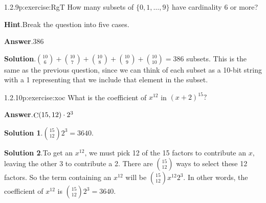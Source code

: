 \documentclass[twoside,11pt,]{book}
\newcommand{\blocktitlefont}{\relax}
\numberwithin{equation}{chapter}
\begin{document}
\begin{divisionsolution}{1.2.9}{}{p:exercise:RgT}%
How many subsets of \(\{0,1,\ldots, 9\}\) have cardinality 6 or more?%
\par\smallskip%
\noindent\textbf{\blocktitlefont Hint}.\quad{}Break the question into five cases.%
\par\smallskip%
\noindent\textbf{\blocktitlefont Answer}.\quad{}\(386\)%
\par\smallskip%
\noindent\textbf{\blocktitlefont Solution}.\quad{}\({10 \choose 6} + {10\choose 7} + {10\choose 8} + {10 \choose 9} + {10\choose 10} = 386\) subsets. This is the same as the previous question, since we can think of each subset as a 10-bit string with a 1 representing that we include that element in the subset.%
\end{divisionsolution}%
\begin{divisionsolution}{1.2.10}{}{p:exercise:xoc}%
What is the coefficient of \(x^{12}\) in \((x+2)^{15}\text{?}\)%
\par\smallskip%
\noindent\textbf{\blocktitlefont Answer}.\quad{}\(\mathop{\rm C}\nolimits\!\left(15,12\right)\cdot 2^{3}\)%
\par\smallskip%
\noindent\textbf{\blocktitlefont Solution 1}.\quad{}\({15\choose 12}2^3 = 3640\text{.}\)%
\par\smallskip%
\noindent\textbf{\blocktitlefont Solution 2}.\quad{}To get an \(x^{12}\text{,}\) we must pick 12 of the 15 factors to contribute an \(x\text{,}\) leaving the other 3 to contribute a 2. There are \({15 \choose 12}\) ways to select these 12 factors. So the term containing an \(x^{12}\) will be \({15 \choose 12}x^{12}2^{3}\text{.}\) In other words, the coefficient of \(x^{12}\) is \({15\choose 12}2^3 = 3640\text{.}\)%
\end{divisionsolution}%
\end{document}
